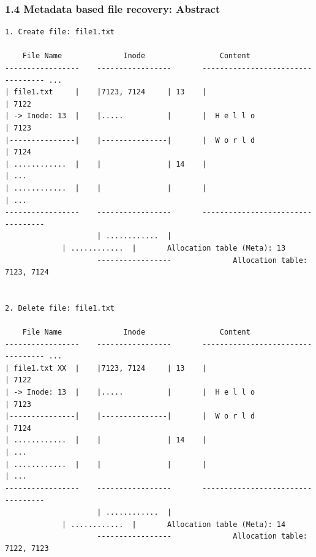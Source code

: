 \begin{frame}[fragile]
  \frametitle{1.4 Metadata based file recovery: Abstract}
  \begin{lstlisting}[basicstyle=\tiny\ttfamily]
1. Create file: file1.txt

    File Name              Inode                 Content     
-----------------    -----------------       ---------------------------------- ...
| file1.txt     |    |7123, 7124     | 13    |                                | 7122
| -> Inode: 13  |    |.....          |       |  H e l l o                     | 7123
|---------------|    |---------------|       |  W o r l d                     | 7124
| ............  |    |               | 14    |                                | ...
| ............  |    |               |       |                                | ...
-----------------    -----------------       ---------------------------------- 
                     | ............  |
		     | ............  |       Allocation table (Meta): 13
                     -----------------              Allocation table: 7123, 7124


2. Delete file: file1.txt

    File Name              Inode                 Content     
-----------------    -----------------       ---------------------------------- ...
| file1.txt XX  |    |7123, 7124     | 13    |                                | 7122
| -> Inode: 13  |    |.....          |       |  H e l l o                     | 7123
|---------------|    |---------------|       |  W o r l d                     | 7124
| ............  |    |               | 14    |                                | ...
| ............  |    |               |       |                                | ...
-----------------    -----------------       ---------------------------------- 
                     | ............  |
		     | ............  |       Allocation table (Meta): 14
                     -----------------              Allocation table: 7122, 7123
  \end{lstlisting}
\end{frame}


